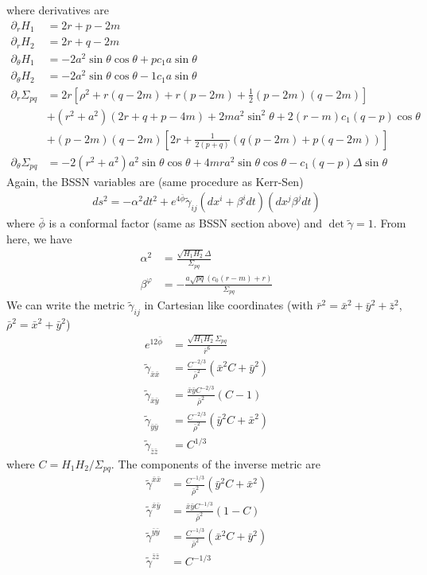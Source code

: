 \documentclass[prd]{revtex4}
\begin{document}
where derivatives are	
\begin{align}
\partial_r H_1 &= 2r+p-2m \\
\partial_r H_2 &= 2r+q-2m \\
\partial_\theta H_1 &= -2a^2 \sin \theta \cos \theta + p c_1 a \sin \theta \\
\partial_\theta H_2 &= -2a^2 \sin \theta \cos \theta - 1 c_1 a \sin \theta \\
\partial_r \Sigma_{pq} &= 2r \left[\rho^2 + r(q-2m) + r(p-2m) + \frac{1}{2} (p-2m)(q-2m) \right] \nonumber \\
					&+(r^2 + a^2)(2r+q+p-4m) + 2ma^2 \sin^2 \theta + 2(r-m)c_1(q-p) \cos \theta \nonumber \\
					&+(p-2m)(q-2m) \left[2r + \frac{1}{2(p+q)} (q(p-2m) + p(q-2m)) \right] \\
\partial_\theta \Sigma_{pq} &= -2(r^2+a^2) a^2 \sin \theta \cos \theta  + 4mra^2 \sin \theta \cos \theta - c_1(q-p) \Delta \sin \theta
\end{align}
Again, the BSSN variables are (same procedure as Kerr-Sen)
\begin{align}
ds^2 = -\alpha^2 dt^2 +e^{4\bar{\phi}} \tilde{\gamma}_{ij} (dx^i + \beta^i dt)(dx^j \beta^j dt)
\end{align}
where $\bar{\phi}$ is a conformal factor (same as BSSN section above) and $\det \tilde{\gamma} = 1$. From here, we have
\begin{align}
\alpha^2 &= \frac{\sqrt{H_1 H_2} \Delta}{\Sigma_{pq}} \\
\beta^{\varphi} &= - \frac{a \sqrt{pq} (c_0 (r-m) + r)}{\Sigma_{pq}}
\end{align}
We can write the metric $\tilde{\gamma}_{ij}$ in Cartesian like coordinates (with $\bar{r}^2 = \bar{x}^2+\bar{y}^2 + \bar{z}^2$, $\bar{\rho}^2= \bar{x}^2+\bar{y}^2$)
\begin{align}
e^{12 \bar{\phi}} &= \frac{\sqrt{H_1 H_2} \Sigma_{pq}}{\bar{r}^6} \\
\tilde{\gamma}_{\bar{x} \bar{x}} &=\frac{C^{-2/3}}{\bar{\rho}^2} (\bar{x}^2 C + \bar{y}^2) \\
\tilde{\gamma}_{\bar{x} \bar{y}} &=\frac{\bar{x} \bar{y} C^{-2/3}}{\bar{\rho}^2} (C-1) \\
\tilde{\gamma}_{\bar{y} \bar{y}} &=\frac{C^{-2/3}}{\bar{\rho}^2} (\bar{y}^2 C + \bar{x}^2)\\
\tilde{\gamma}_{\bar{z} \bar{z}} &=C^{1/3}
\end{align}
where $C = H_1 H_2/\Sigma_{pq}$. The components of the inverse metric are
\begin{align}
\tilde{\gamma}^{\bar{x} \bar{x}} &=\frac{C^{-1/3}}{\bar{\rho}^2} (\bar{y}^2 C + \bar{x}^2) \\
\tilde{\gamma}^{\bar{x} \bar{y}} &=\frac{\bar{x} \bar{y} C^{-1/3}}{\bar{\rho}^2} (1- C) \\
\tilde{\gamma}^{\bar{y} \bar{y}} &=\frac{C^{-1/3}}{\bar{\rho}^2} (\bar{x}^2 C + \bar{y}^2)\\
\tilde{\gamma}^{\bar{z} \bar{z}} &=C^{-1/3}
\end{align}
\end{document}
